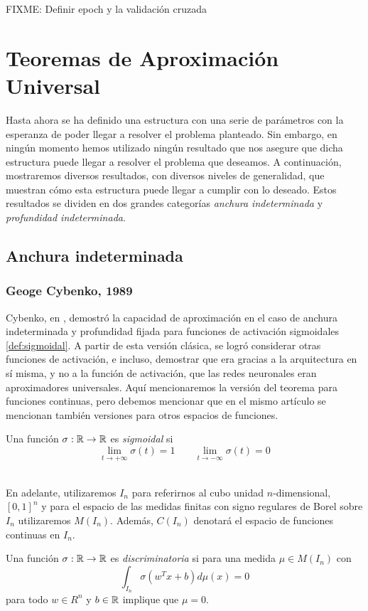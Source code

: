FIXME: Definir epoch y la validación cruzada

\chapter{Teoremas de Aproximación Universal}
Hasta ahora se ha definido una estructura con una serie de parámetros con la esperanza de poder llegar a resolver el problema planteado. Sin embargo, en ningún momento hemos utilizado ningún resultado que nos asegure que dicha estructura puede llegar a resolver el problema que deseamos. A continuación, mostraremos diversos resultados, con diversos niveles de generalidad, que muestran cómo esta estructura puede llegar a cumplir con lo deseado. Estos resultados se dividen en dos grandes categorías \emph{anchura indeterminada} y \emph{profundidad indeterminada}.

\section{Anchura indeterminada}
\subsection{Geoge Cybenko, 1989}
Cybenko, en \cite{cybenko1989approximation}, demostró la capacidad de aproximación en el caso de anchura indeterminada y profundidad fijada para funciones de activación sigmoidales \autoref{def:sigmoidal}. A partir de esta versión clásica, se logró considerar otras funciones de activación, e incluso, demostrar que era gracias a la arquitectura en sí misma, y no a la función de activación, que las redes neuronales eran aproximadores universales. Aquí mencionaremos la versión del teorema para funciones continuas, pero debemos mencionar que en el mismo artículo se mencionan también versiones para otros espacios de funciones.
\begin{definicion}\label{def:sigmoidal}
Una función $\sigma : \mathbb{R} \to \mathbb{R}$ es \emph{sigmoidal} si $$\lim_{t\to +\infty} \sigma(t)=1 \;\;\;\;\;\;\; \lim_{t\to -\infty} \sigma(t)=0$$
\end{definicion}\\

En adelante, utilizaremos $I_n$ para referirnos al cubo unidad $n$-dimensional, $[0,1]^n$ y para el espacio de las medidas finitas con signo regulares de Borel sobre $I_n$ utilizaremos $M(I_n)$. Además, $C(I_n)$ denotará el espacio de funciones continuas en $I_n$.

\begin{definicion}\label{def:discriminatoria}
Una función $\sigma : \mathbb{R} \to \mathbb{R}$ es \emph{discriminatoria} si para una medida $\mu \in M(I_n)$ con $$\int_{I_n} \sigma(w^Tx+b) d\mu(x)=0$$ para todo $ w\in R^n$ y $b\in\mathbb{R}$ implique que $\mu=0$.
\end{definicion}


